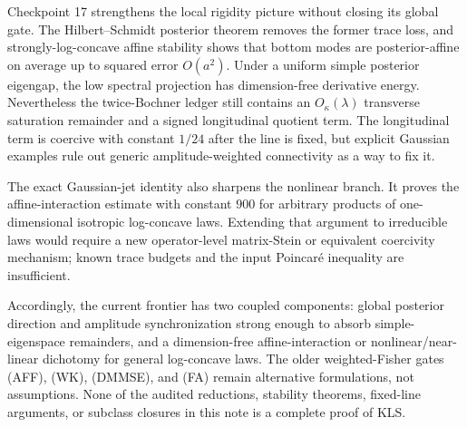 \documentclass[11pt]{article}
\theoremstyle{definition}
\theoremstyle{remark}
\newcommand{\1}{\mathbf 1}
\begin{document}
Checkpoint 17 strengthens the local rigidity picture without closing its
global gate.  The Hilbert--Schmidt posterior theorem removes the former
trace loss, and strongly-log-concave affine stability shows that bottom
modes are posterior-affine on average up to squared error \(O(a^2)\).
Under a uniform simple posterior eigengap, the low spectral projection has
dimension-free derivative energy.  Nevertheless the twice-Bochner ledger
still contains an \(O_\kappa(\lambda)\) transverse saturation remainder
and a signed longitudinal quotient term.  The longitudinal term is
coercive with constant \(1/24\) after the line is fixed, but explicit
Gaussian examples rule out generic amplitude-weighted connectivity as a
way to fix it.

The exact Gaussian-jet identity also sharpens the nonlinear branch.  It
proves the affine-interaction estimate with constant \(900\) for arbitrary
products of one-dimensional isotropic log-concave laws.  Extending that
argument to irreducible laws would require a new operator-level
matrix-Stein or equivalent coercivity mechanism; known trace budgets and
the input Poincar\'e inequality are insufficient.

Accordingly, the current frontier has two coupled components: global
posterior direction and amplitude synchronization strong enough to absorb
simple-eigenspace remainders, and a dimension-free affine-interaction or
nonlinear/near-linear dichotomy for general log-concave laws.  The older
weighted-Fisher gates (AFF), (WK), (DMMSE), and (FA) remain alternative
formulations, not assumptions.  None of the audited reductions, stability
theorems, fixed-line arguments, or subclass closures in this note is a
complete proof of KLS.
\end{document}

